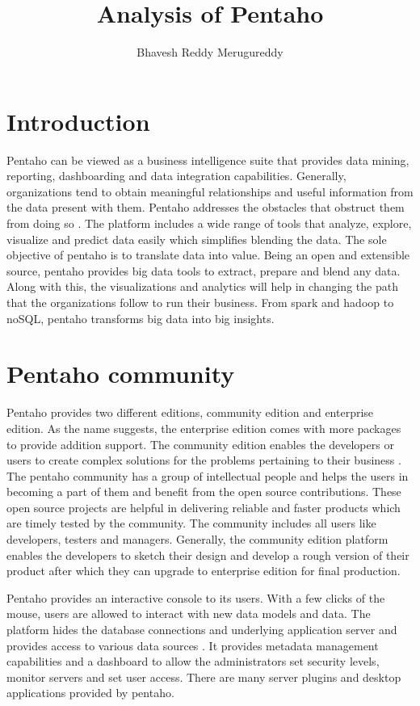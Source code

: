 \documentclass[9pt,twocolumn,twoside]{styles/osajnl}
\title{ Analysis of Pentaho}
\author[1,*]{Bhavesh Reddy Merugureddy}
\affil[1]{School of Informatics and Computing, Bloomington, IN 47408, U.S.A.}
\affil[*]{Corresponding authors: bmerugur@umail.iu.edu}
\begin{document}
\maketitle

\section{Introduction}

Pentaho can be viewed as a business intelligence suite that provides
data mining, reporting, dashboarding and data integration
capabilities. Generally, organizations tend to obtain meaningful
relationships and useful information from the data present with
them. Pentaho addresses the obstacles that obstruct them from doing so
\cite{pent1}. The platform includes a wide range of tools that
analyze, explore, visualize and predict data easily which simplifies
blending the data. The sole objective of pentaho is to translate data
into value. Being an open and extensible source, pentaho provides big
data tools to extract, prepare and blend any data. Along with this,
the visualizations and analytics will help in changing the path that
the organizations follow to run their business. From spark and hadoop
to noSQL, pentaho transforms big data into big insights.

\section{Pentaho community}

Pentaho provides two different editions, community edition and
enterprise edition. As the name suggests, the enterprise edition comes
with more packages to provide addition support. The community edition
enables the developers or users to create complex solutions for the
problems pertaining to their business \cite{pent2}. The pentaho
community has a group of intellectual people and helps the users in
becoming a part of them and benefit from the open source
contributions. These open source projects are helpful in delivering
reliable and faster products which are timely tested by the
community. The community includes all users like developers, testers
and managers. Generally, the community edition platform enables the
developers to sketch their design and develop a rough version of their
product after which they can upgrade to enterprise edition for final
production.

Pentaho provides an interactive console to its users. With a few
clicks of the mouse, users are allowed to interact with new data
models and data. The platform hides the database connections and
underlying application server and provides access to various data
sources \cite{pent3}. It provides metadata management capabilities and
a dashboard to allow the administrators set security levels, monitor
servers and set user access. There are many server plugins and desktop
applications provided by pentaho.
\end{document}

